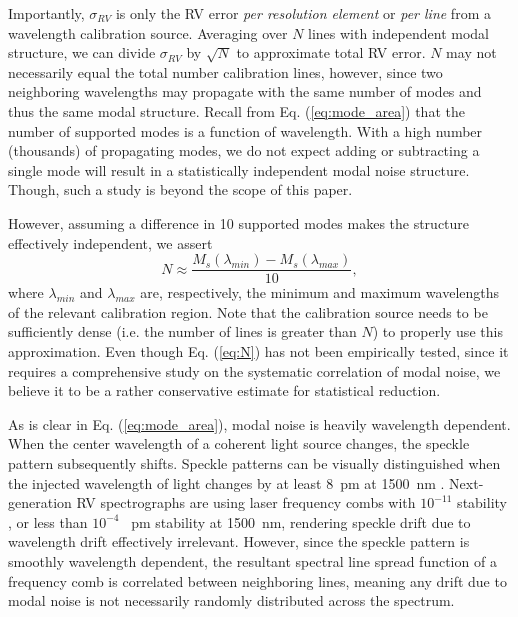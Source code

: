 \documentclass[11pt]{article}
\begin{document}
Importantly, $\sigma_{RV}$ is only the RV error \textit{per resolution element} or \textit{per line} from a wavelength calibration source. Averaging over $N$ lines with independent modal structure, we can divide $\sigma_{RV}$ by $\sqrt{N}$ to approximate total RV error. $N$ may not necessarily equal the total number calibration lines, however, since two neighboring wavelengths may propagate with the same number of modes and thus the same modal structure. Recall from Eq. (\ref{eq:mode_area}) that the number of supported modes is a function of wavelength. With a high number (thousands) of propagating modes, we do not expect adding or subtracting a single mode will result in a statistically independent modal noise structure. Though, such a study is beyond the scope of this paper.

However, assuming a difference in 10 supported modes makes the structure effectively independent, we assert
\begin{equation}
N \approx \frac{M_s(\lambda_{min}) - M_s(\lambda_{max})}{10},
\label{eq:N}
\end{equation}
where $\lambda_{min}$ and $\lambda_{max}$ are, respectively, the minimum and maximum wavelengths of the relevant calibration region. Note that the calibration source needs to be sufficiently dense (i.e. the number of lines is greater than $N$) to properly use this approximation. Even though Eq. (\ref{eq:N}) has not been empirically tested, since it requires a comprehensive study on the systematic correlation of modal noise, we believe it to be a rather conservative estimate for statistical reduction.

As is clear in Eq. (\ref{eq:mode_area}), modal noise is heavily wavelength dependent. When the center wavelength of a coherent light source changes, the speckle pattern subsequently shifts.  Speckle patterns can be visually distinguished when the injected wavelength of light changes by at least \SI{8}{\pico\meter} at \SI{1500}{\nano\meter} \citep{Redding2013}. Next-generation RV spectrographs are using laser frequency combs with $10^{-11}$ stability \citep{Probst2014}, or less than $10^{-4}$ \SI{}{\pico\meter} stability at \SI{1500}{\nano\meter}, rendering speckle drift due to wavelength drift effectively irrelevant. However, since the speckle pattern is smoothly wavelength dependent, the resultant spectral line spread function of a frequency comb is correlated between neighboring lines, meaning any drift due to modal noise is not necessarily randomly distributed across the spectrum.
\end{document}
